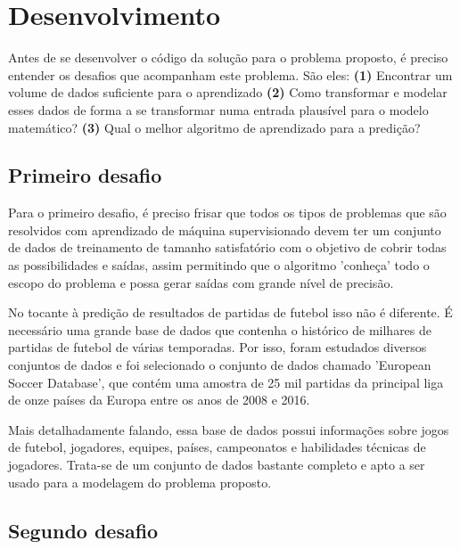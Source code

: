 

\section{Desenvolvimento}\label{sec:desenvolvimento}

Antes de se desenvolver o código da solução para o problema proposto, é preciso entender os desafios que acompanham este problema. São eles: 
\noindent\textbf{(1)} Encontrar um volume de dados suficiente para o aprendizado 
\noindent\textbf{(2)} Como transformar e modelar esses dados de forma a se transformar numa entrada plausível para o modelo matemático? 
\noindent\textbf{(3)} Qual o melhor algoritmo de aprendizado para a predição?

\subsection{Primeiro desafio}

Para o primeiro desafio, é preciso frisar que todos os tipos de problemas que são resolvidos com aprendizado de máquina supervisionado devem ter um conjunto de dados de treinamento de tamanho satisfatório com o objetivo de cobrir todas as possibilidades e saídas, assim permitindo que o algoritmo 'conheça' todo o escopo do problema e possa gerar saídas com grande nível de precisão.

No tocante à predição de resultados de partidas de futebol isso não é diferente. É necessário uma grande base de dados que contenha o histórico de milhares de partidas de futebol de  várias temporadas. Por isso, foram estudados diversos conjuntos de dados e foi selecionado o conjunto de dados chamado 'European Soccer Database', que contém uma amostra de 25 mil partidas da principal liga de onze países da Europa entre os anos de 2008 e 2016.

Mais detalhadamente falando, essa base de dados possui informações sobre jogos de futebol, jogadores, equipes, países, campeonatos e habilidades técnicas de jogadores. Trata-se de um conjunto de dados bastante completo e apto a ser usado para a modelagem do problema proposto.

\subsection{Segundo desafio}

